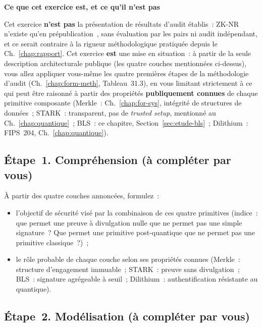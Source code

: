 \begin{boxalert}
\textbf{Ce que cet exercice est, et ce qu'il n'est pas}

Cet exercice \textbf{n'est pas} la présentation de résultats d'audit
établis~: ZK-NR n'existe qu'en prépublication~\cite{minka2025zknr},
sans évaluation par les pairs ni audit indépendant, et ce serait contraire à la rigueur
méthodologique pratiquée depuis le Ch.~\ref{chap:rapport}. Cet
exercice \textbf{est} une mise en situation~: à partir de la seule
description architecturale publique (les quatre couches mentionnées
ci-dessus), vous allez appliquer vous-même les quatre premières
étapes de la méthodologie d'audit (Ch.~\ref{chap:form-meth},
Tableau~31.3), en vous limitant strictement à ce qui peut être
raisonné à partir des propriétés \textbf{publiquement connues} de
chaque primitive composante (Merkle~: Ch.~\ref{chap:for-sys},
intégrité de structures de données~; STARK~: transparent, pas de
\textit{trusted setup}, mentionné au Ch.~\ref{chap:quantique}~;
BLS~: ce chapitre, Section~\ref{sec:etude-bls}~; Dilithium~:
FIPS~204, Ch.~\ref{chap:quantique}).
\end{boxalert}

\subsection{Étape~1. Compréhension (à compléter par vous)}

À partir des quatre couches annoncées, formulez~:
\begin{itemize}
    \item l'objectif de sécurité visé par la combinaison de ces
          quatre primitives (indice~: que permet une preuve à
          divulgation nulle que ne permet pas une simple signature~? Que
          permet une primitive post-quantique que ne permet pas une
          primitive classique~?)~;
    \item le rôle probable de chaque couche selon ses propriétés
          connues (Merkle~: structure d'engagement immuable~;
          STARK~: preuve sans divulgation~; BLS~: signature
          agrégeable à seuil~; Dilithium~: authentification résistante
          au quantique).
\end{itemize}

\subsection{Étape~2. Modélisation (à compléter par vous)}

